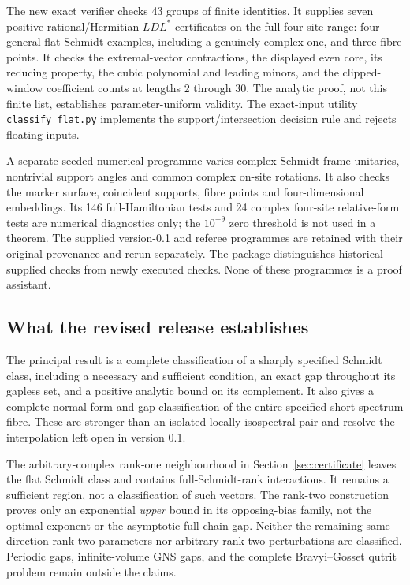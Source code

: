 \documentclass[11pt,a4paper]{article}
\theoremstyle{remark}\newtheorem{remark}[theorem]{Remark}
\begin{document}
The new exact verifier checks 43 groups of finite identities. It supplies seven positive rational/Hermitian $LDL^*$ certificates on the full four-site range: four general flat-Schmidt examples, including a genuinely complex one, and three fibre points. It checks the extremal-vector contractions, the displayed even core, its reducing property, the cubic polynomial and leading minors, and the clipped-window coefficient counts at lengths 2 through 30. The analytic proof, not this finite list, establishes parameter-uniform validity. The exact-input utility \texttt{classify\_flat.py} implements the support/intersection decision rule and rejects floating inputs.

A separate seeded numerical programme varies complex Schmidt-frame unitaries, nontrivial support angles and common complex on-site rotations. It also checks the marker surface, coincident supports, fibre points and four-dimensional embeddings. Its 146 full-Hamiltonian tests and 24 complex four-site relative-form tests are numerical diagnostics only; the $10^{-9}$ zero threshold is not used in a theorem. The supplied version-0.1 and referee programmes are retained with their original provenance and rerun separately. The package distinguishes historical supplied checks from newly executed checks. None of these programmes is a proof assistant.

\subsection{What the revised release establishes}
The principal result is a complete classification of a sharply specified Schmidt class, including a necessary and sufficient condition, an exact gap throughout its gapless set, and a positive analytic bound on its complement. It also gives a complete normal form and gap classification of the entire specified short-spectrum fibre. These are stronger than an isolated locally-isospectral pair and resolve the interpolation left open in version 0.1.

The arbitrary-complex rank-one neighbourhood in Section~\ref{sec:certificate} leaves the flat Schmidt class and contains full-Schmidt-rank interactions. It remains a sufficient region, not a classification of such vectors. The rank-two construction proves only an exponential \emph{upper} bound in its opposing-bias family, not the optimal exponent or the asymptotic full-chain gap. Neither the remaining same-direction rank-two parameters nor arbitrary rank-two perturbations are classified. Periodic gaps, infinite-volume GNS gaps, and the complete Bravyi--Gosset qutrit problem remain outside the claims.
\end{document}
